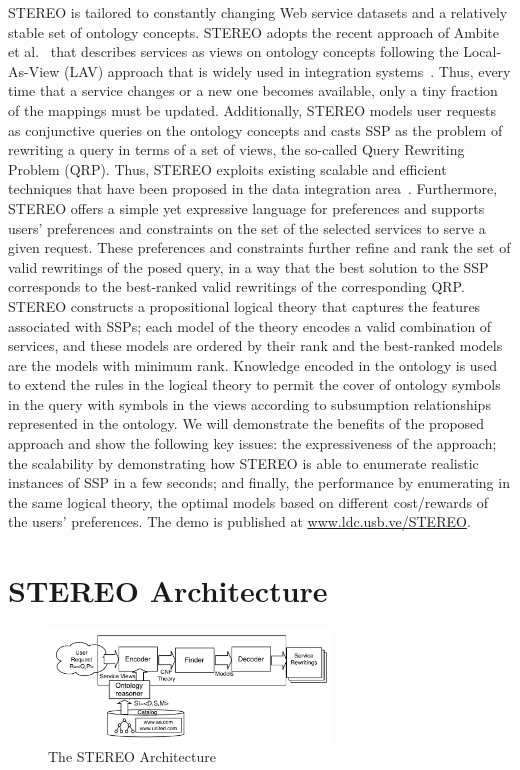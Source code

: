 \documentclass{llncs}
\begin{document}
 STEREO is tailored to constantly changing Web service datasets and a relatively stable set of ontology concepts. STEREO adopts  the recent approach of Ambite et al.\ \cite{AmbiteISWC09}
that describes services as views on ontology concepts following the Local-As-View (LAV) approach that is widely used in integration
systems~\cite{levy:bucket}. Thus, every time that a service changes or
a new one becomes available, only a tiny fraction of the mappings
must be updated. Additionally,   STEREO models user requests  as conjunctive queries on the ontology concepts and casts  SSP  as the problem
of rewriting a query in terms of a set of views, the so-called Query
Rewriting Problem (QRP). Thus, STEREO exploits existing scalable and efficient techniques that have been proposed in the data integration area~\cite{arvelo:aaai06,levy:bucket,pottinger:minicon}.
Furthermore, STEREO offers a simple yet expressive language for preferences and supports users' preferences and constraints on the set of the
selected services to serve a given request. 
These preferences and constraints further refine and rank 
the set of valid rewritings of the posed query, in a way that
the best solution to the SSP corresponds to the best-ranked 
valid rewritings of the corresponding QRP. STEREO  constructs a propositional logical theory  that captures 
the features associated with SSPs; each model of the theory encodes a valid combination of services, and these models are ordered by their rank and the best-ranked
models are the models with minimum rank. Knowledge encoded in the ontology is used to extend the rules in the logical theory to permit the cover of ontology symbols in
the query with symbols in the views according to subsumption relationships represented in the ontology. 
We will demonstrate the benefits of the proposed approach and show the following key issues:   the expressiveness of the approach; the scalability  by demonstrating how STEREO is able to enumerate realistic instances of SSP in a few seconds; and finally, the performance  by enumerating in the same logical theory, the optimal models based on different cost/rewards of the users' preferences.  The demo is published at \url{www.ldc.usb.ve/STEREO}.
 
 
\section{STEREO Architecture}
\begin{figure}[t]
\centering
\includegraphics[height=30mm,width=.6\textwidth]{architecture.pdf}
\caption{The STEREO Architecture}
\label{fig:architecture}
\end{figure}
\end{document}
